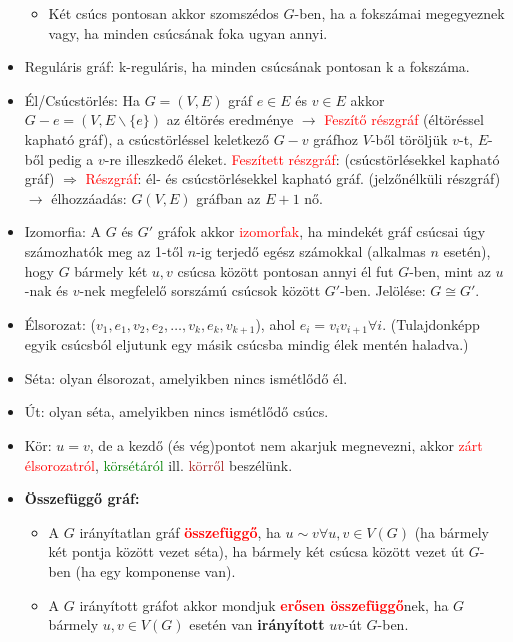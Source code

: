 \documentclass[../../szobeli.tex]{subfiles}
\begin{document}
\begin{itemize}
\begin{itemize}
            \item Két csúcs pontosan akkor szomszédos $G$-ben, ha a fokszámai megegyeznek vagy, ha minden csúcsának foka ugyan annyi.
        \end{itemize}
        \item Reguláris gráf: k-reguláris, ha minden csúcsának pontosan k a fokszáma.
        \item Él/Csúcstörlés: Ha $G=(V,E)$ gráf $e \in E$ és $v \in E$ akkor $G-e=(V,E \backslash \{e\})$ az éltörés eredménye $\rightarrow$ \textcolor{red}{Feszítő részgráf} (éltöréssel kapható gráf), a csúcstörléssel keletkező $G-v$ gráfhoz $V$-ből töröljük $v$-t, $E$-ből pedig a $v$-re illeszkedő éleket. \textcolor{red}{Feszített részgráf}: (csúcstörlésekkel kapható gráf) $\Rightarrow$ \textcolor{red}{Részgráf}: él- és csúcstörlésekkel kapható gráf. (jelzőnélküli részgráf) $\rightarrow$ élhozzáadás: $G(V,E)$ gráfban az $E+1$ nő.
        \item Izomorfia: A $G$ és $G'$ gráfok akkor \textcolor{red}{izomorfak}, ha mindekét gráf csúcsai úgy számozhatók meg az 1-től $n$-ig terjedő egész számokkal (alkalmas $n$ esetén), hogy $G$ bármely két $u,v$ csúcsa között pontosan annyi él fut $G$-ben, mint az $u$-nak és $v$-nek megfelelő sorszámú csúcsok között $G'$-ben. Jelölése: $G \cong G'$.
        \item Élsorozat: ($v_1,e_1,v_2,e_2,\dots,v_k,e_k,v_{k+1}$), ahol $e_i=v_i v_{i+1}\forall i$. (Tulajdonképp egyik csúcsból eljutunk egy másik csúcsba mindig élek mentén haladva.)
        \item Séta: olyan élsorozat, amelyikben nincs ismétlődő él. 	
        \item Út: olyan séta, amelyikben nincs ismétlődő csúcs.
        \item Kör: $u = v$, de a kezdő (és vég)pontot nem akarjuk megnevezni, akkor \textcolor{red}{zárt élsorozatról}, \textcolor{green}{körsétáról} ill. \textcolor{brown}{körről} beszélünk.
        \item \textbf{Összefüggő gráf:} \begin{itemize}
            \item A $G$ irányítatlan gráf \textcolor{red}{\textbf{összefüggő}}, ha $u \sim v \forall u,v \in V(G)$ (ha bármely két pontja között vezet séta), ha bármely két csúcsa között vezet út $G$-ben (ha egy komponense van).
            \item A $G$ irányított gráfot akkor mondjuk \textcolor{red}{\textbf{erősen összefüggő}}nek, ha $G$ bármely $u,v \in V(G) $ esetén van \textbf{irányított} $uv$-út $G$-ben.

\end{itemize}
\end{itemize}
\end{document}
